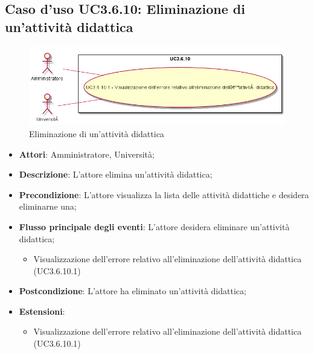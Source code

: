 \subsection{Caso d'uso \texorpdfstring{UC3.6.10}{UC3.6.10}: Eliminazione di un'attività didattica}
\begin{figure} [H]
\centering
\includegraphics[scale=0.45]{./img/UC3-6-10.png}
\caption{Eliminazione di un'attività didattica}\label{}
\end{figure}
\begin{itemize}
\item \textbf{Attori}: Amministratore, Università;
\item \textbf{Descrizione}: L'attore elimina un'attività didattica;

\item \textbf{Precondizione}: L'attore visualizza la lista delle attività didattiche e desidera eliminarne una;

\item \textbf{Flusso principale degli eventi}: L'attore desidera eliminare un'attività didattica;

\begin{itemize}
\item Visualizzazione dell'errore relativo all'eliminazione dell’attività didattica (UC3.6.10.1)
\end{itemize}
\item \textbf{Postcondizione}: L'attore ha eliminato un'attività didattica;

\item \textbf{Estensioni}:
\begin{itemize}
\item Visualizzazione dell'errore relativo all'eliminazione dell’attività didattica (UC3.6.10.1)
\end{itemize}
\end{itemize}
